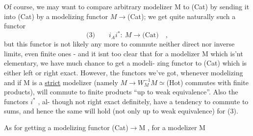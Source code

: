 Of course,  we may want to compare  arbitrary modelizer M to (Cat)
by sending it into (Cat) by a modelizing functor  $M\longrightarrow$(Cat);  we get quite
naturally such a functor 
\[ \text{(3)}\qquad i_Ai^{*} :\ M\longrightarrow\text{(Cat)}\quad , \]
but this functor is not likely any more to commute  neither direct nor
inverse limits, even finite ones  -  and it isnt too clear that for a
modelizer M which is'nt elementary,  we have much chance to get a modeli-%
zing functor to (Cat) which is either left or right exact.  However,  the
functors we've got,  whenever modelizing and if M is a \uline{strict} modelizer
(namely $M\longrightarrow W_M^{-1}M\simeq$(Hot)  commutes with finite products),  will commute
to finite products ``up to weak equivalence''.  Also the functors $i^{*}$ ,  al-%
though not right exact definitely,  have a tendency to commute to sums,
and hence the same will hold (not only up to weak equivalence) for (3).

As for getting a modelizing functor  (Cat)$\longrightarrow$M ,  for a modelizer M

